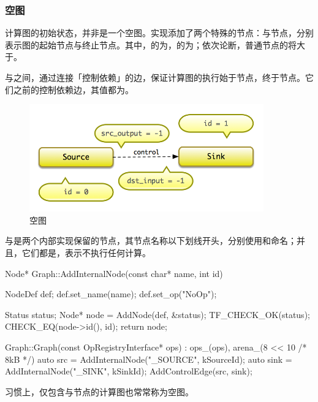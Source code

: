 \begin{content}
\subsubsection{空图}

计算图的初始状态，并非是一个空图。实现添加了两个特殊的节点：与节点，分别表示图的起始节点与终止节点。其中，的为，的为；依次论断，普通节点的将大于。

与之间，通过连接「控制依赖」的边，保证计算图的执行始于节点，终于节点。它们之前的控制依赖边，其值都为。

\begin{figure}[H]
\centering
\includegraphics[width=0.9\textwidth]{figures/cc-empty-graph.png}
\caption{空图}
 \label{fig:cc-empty-graph}
\end{figure}

与是两个内部实现保留的节点，其节点名称以下划线开头，分别使用和命名；并且，它们都是，表示不执行任何计算。

\begin{leftbar}
\begin{c++}
Node* Graph::AddInternalNode(const char* name, int id) {
  NodeDef def;
  def.set_name(name);
  def.set_op("NoOp");

  Status status;
  Node* node = AddNode(def, &status);
  TF_CHECK_OK(status);
  CHECK_EQ(node->id(), id);
  return node;
}

Graph::Graph(const OpRegistryInterface* ops)
    : ops_(ops), arena_(8 << 10 /* 8kB */) {
  auto src  = AddInternalNode("_SOURCE", kSourceId);
  auto sink = AddInternalNode("_SINK",   kSinkId);
  AddControlEdge(src, sink);
}
\end{c++}
\end{leftbar}

习惯上，仅包含与节点的计算图也常常称为空图。


\end{content}
